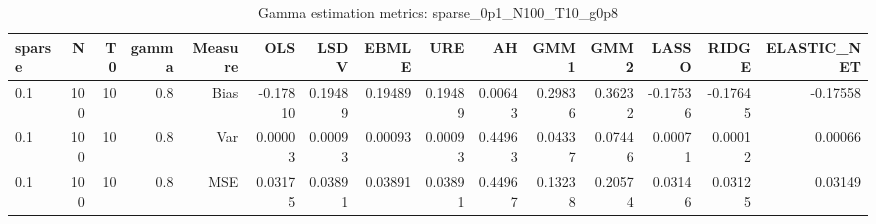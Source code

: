 \begin{table}[!htbp]\centering
\caption{Gamma estimation metrics: sparse_0p1_N100_T10_g0p8}
\label{tab:table1_sparse_0p1_N100_T10_g0p8}
\begin{tabular}{lrrrrrrrrrrrrrr}
\hline
sparse & N & T0 & gamma & Measure & OLS & LSDV & EBMLE & URE & AH & GMM1 & GMM2 & LASSO & RIDGE & ELASTIC_NET \\
\hline
0.1 & 100 & 10 & 0.8 & Bias & -0.17810 & 0.19489 & 0.19489 & 0.19489 & 0.00643 & 0.29836 & 0.36232 & -0.17536 & -0.17645 & -0.17558 \\
0.1 & 100 & 10 & 0.8 & Var & 0.00003 & 0.00093 & 0.00093 & 0.00093 & 0.44963 & 0.04337 & 0.07446 & 0.00071 & 0.00012 & 0.00066 \\
0.1 & 100 & 10 & 0.8 & MSE & 0.03175 & 0.03891 & 0.03891 & 0.03891 & 0.44967 & 0.13238 & 0.20574 & 0.03146 & 0.03125 & 0.03149 \\
\hline
\end{tabular}
\end{table}

